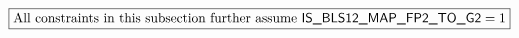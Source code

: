 \[
	\boxed{\text{All constraints in this subsection further assume } \textsf{IS\_BLS12\_MAP\_FP2\_TO\_G2} = 1}
\]